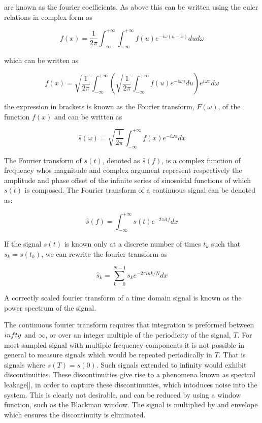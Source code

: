 are known as the fourier coefficients. As above this can be written using the euler relations in complex form as

$$
f(x) = \frac{1}{2 \pi} \int_{-\infty}^{+\infty} \int_{-\infty}^{+\infty} f(u) e^{- i \omega (u - x)} du d\omega
$$

which can be written as

$$
f(x) = \sqrt{\frac{1}{2 \pi}} \int_{-\infty}^{+\infty} \left( \sqrt{\frac{1}{2 \pi}} \int_{-\infty}^{+\infty} f(u) e^{- i \omega u} du \right) e^{i \omega x} d\omega
$$

the expression in brackets is known as the Fourier transform, $F(\omega)$, of the function $f(x)$ and can be written as

$$
\hat{s}(\omega) = \sqrt{\frac{1}{2 \pi}} \int_{-\infty}^{+\infty} f(x) e^{- i \omega x} dx
$$

The Fourier transform of $s(t)$, denoted as $\hat{s}(f)$, is a complex function of frequency whos magnitude and complex argument represent respectively the amplitude and phase offset of the infinite series of sinosoidal functions of which $s(t)$ is composed. The Fourier transform of a continuous signal can be denoted as:

$$
\hat{s}(f) = \int_{-\infty}^{+\infty} s(t) e^{-2 \pi i t f} dx
$$

If the signal $s(t)$ is known only at a discrete number of times $t_k$ such that $s_k = s(t_k)$, we can rewrite the fourier transform as

$$
\hat{s}_k = \sum_{k=0}^{N-1} s_k e^{-2 \pi i n k / N} dx
$$

A correctly scaled fourier transform of a time domain signal is known as the power spectrum of the signal.

The continuous fourier transform requires that integration is preformed between $\-infty$ and $\infty$, or over an integer multiple of the periodicity of the signal, $T$. For most sampled signal with multiple frequency components it is not possible in general to measure signals which would be repeated periodically in $T$. That is signals where $s(T) = s(0)$. Such signals extended to infinity would exhibit discontinuities. These discontinuities give rise to a phenomena known as spectral leakage[], in order to capture these discontinuities, which intoduces noise into the system. This is clearly not desirable, and can be reduced by using a window function, such as the Blackman window. The signal is multiplied by and envelope which ensures the discontinuity is eliminated.

